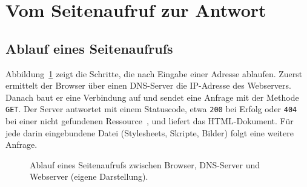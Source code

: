 \section{Vom Seitenaufruf zur Antwort}
\label{sec:ablauf}

\subsection{Ablauf eines Seitenaufrufs}
\label{sec:schritte}

Abbildung~\ref{fig:ablauf} zeigt die Schritte, die nach Eingabe einer Adresse
ablaufen. Zuerst ermittelt der Browser über einen DNS-Server die IP-Adresse
des Webservers. Danach baut er eine Verbindung auf und sendet eine Anfrage mit
der Methode \texttt{GET}. Der Server antwortet mit einem Statuscode, etwa
\texttt{200} bei Erfolg oder \texttt{404} bei einer nicht gefundenen
Ressource~\cite{rfc9110}, und liefert das HTML-Dokument. Für jede darin
eingebundene Datei (Stylesheets, Skripte, Bilder) folgt eine weitere Anfrage.

\begin{figure}[htb]
  \centering
  \caption{Ablauf eines Seitenaufrufs zwischen Browser, DNS-Server und
           Webserver (eigene Darstellung).}
  \label{fig:ablauf}
\end{figure}
